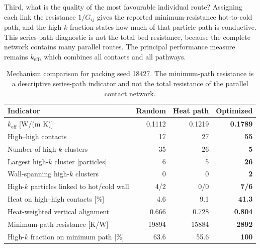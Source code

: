 \documentclass[12pt,a4paper]{article}
\begin{document}
	Third, what is the quality of the most favourable individual route? Assigning
	each link the resistance $1/G_{ij}$ gives the reported minimum-resistance
	hot-to-cold path, and the high-$k$ fraction states how much of that particle path
	is conductive. This series-path diagnostic is not the total bed resistance,
	because the complete network contains many parallel routes. The principal
	performance measure remains $k_{\mathrm{eff}}$, which combines all contacts and
	all pathways.
	
	\begin{table}[!htbp]
		\centering
		\caption{Mechanism comparison for packing seed 18427. The minimum-path
			resistance is a descriptive series-path indicator and not the total resistance
			of the parallel contact network.}
		\label{tab:mechanism}
		\small
		\begin{tabular}{P{5.1cm}rrr}
			\toprule
			\textbf{Indicator} & \textbf{Random} & \textbf{Heat path} & \textbf{Optimized} \\
			\midrule
			$k_{\mathrm{eff}}$ [W/(m K)] & 0.1112 & 0.1219 & \textbf{0.1789} \\
			High--high contacts & 17 & 27 & \textbf{55} \\
			Number of high-$k$ clusters & 35 & 26 & \textbf{5} \\
			Largest high-$k$ cluster [particles] & 6 & 5 & \textbf{26} \\
			Wall-spanning high-$k$ clusters & 0 & 0 & \textbf{2} \\
			High-$k$ particles linked to hot/cold wall & 4/2 & 0/0 & \textbf{7/6} \\
			Heat on high--high contacts [\%] & 4.6 & 9.1 & \textbf{41.3} \\
			Heat-weighted vertical alignment & 0.666 & 0.728 & \textbf{0.804} \\
			Minimum-path resistance [K/W] & 19894 & 15884 & \textbf{2892} \\
			High-$k$ fraction on minimum path [\%] & 63.6 & 55.6 & \textbf{100} \\
			\bottomrule
		\end{tabular}
	\end{table}
\end{document}
